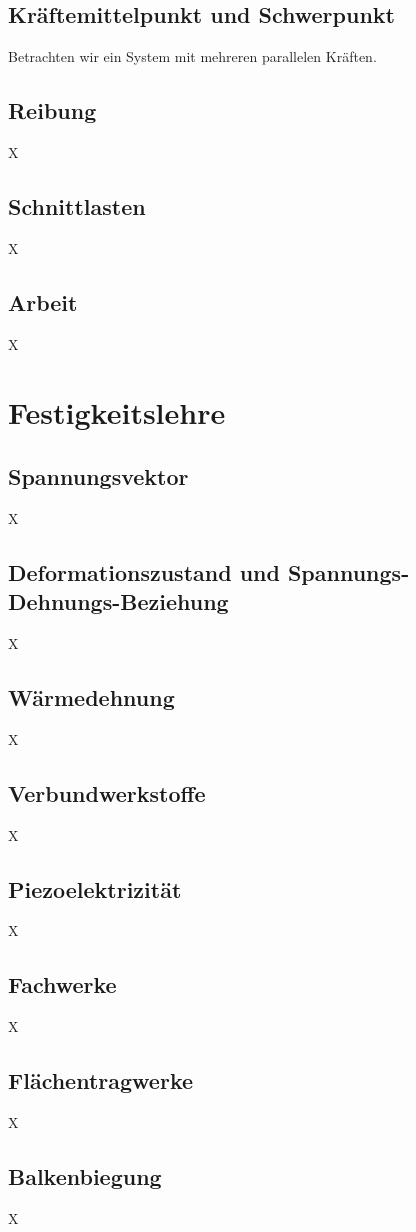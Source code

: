 \documentclass[a4paper,parskip=half*,DIV=7,fontsize=11pt]{scrartcl}
\begin{document}
	\subsection{Kräftemittelpunkt und Schwerpunkt}
	Betrachten wir ein System mit mehreren parallelen Kräften.
	
	\subsection{Reibung}
	X
	
	\subsection{Schnittlasten}
	X
	
	\subsection{Arbeit}
	X
	
	\pagebreak
	\section{Festigkeitslehre}
	\subsection{Spannungsvektor}
	X
	
	\subsection{Deformationszustand und Spannungs-Dehnungs-Beziehung}
	X
	
	\subsection{Wärmedehnung}
	X
	
	\subsection{Verbundwerkstoffe}
	X
	
	\subsection{Piezoelektrizität}
	X
	
	\subsection{Fachwerke}
	X
	
	\subsection{Flächentragwerke}
	X
	
	\subsection{Balkenbiegung}
	X
	
\end{document}
